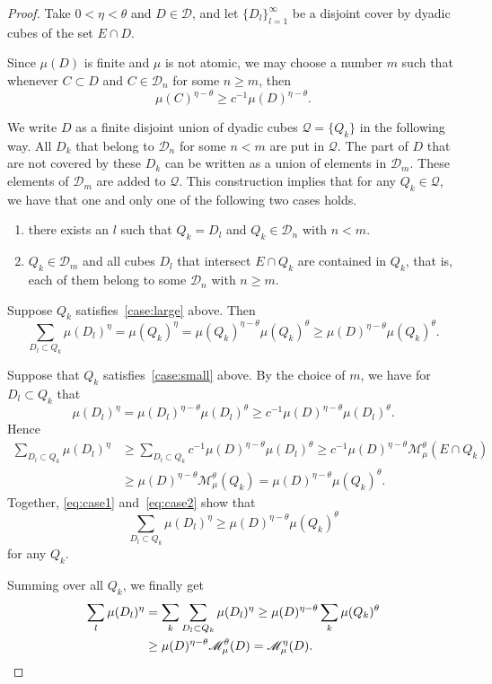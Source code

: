 \documentclass[AHL,Unicode,longabstracts]{cedram}
\begin{document}
\begin{proof}
Take $0 < \eta < \theta$ and $D \in \mathscr{D}$, and let $\{D_l\}_{l=1}^\infty$ be a disjoint cover by dyadic cubes of the set $E \cap D$.

Since $\mu (D)$ is finite and $\mu$ is not atomic, we may choose a number $m$ such that whenever $C \subset D$ and $C \in
\mathscr{D}_n$ for some $n \geq m$, then
\[
\mu (C)^{\eta-\theta} \geq c^{-1} \mu (D)^{\eta-\theta}.
\]

We write $D$ as a finite disjoint union of dyadic cubes $\mathscr{Q} = \{Q_k\}$ in the following way. All $D_k$ that belong to $\mathscr{D}_n$ for some $n < m$ are put in $\mathscr{Q}$. The part of $D$ that are not covered by these $D_k$ can be written as a union of elements in $\mathscr{D}_m$. These elements of $\mathscr{D}_m$ are added to $\mathscr{Q}$. This construction implies that for any $Q_k \in \mathscr{Q}$, we have that one and only one of the following two cases holds.
\renewcommand{\theenumi}{\roman{enumi}}
\begin{enumerate}
\item \label{case:large}
there exists an $l$ such that $Q_k = D_l$ and $Q_k \in
\mathscr{D}_n$ with $n < m$.
\item \label{case:small}
$Q_k \in \mathscr{D}_m$ and all cubes $D_l$ that intersect $E
\cap Q_k$ are contained in $Q_k$, that is, each of them belong to some $\mathscr{D}_n$ with $n \geq m$.
\end{enumerate}

Suppose $Q_k$ satisfies~\eqref{case:large} above. Then
\begin{equation}\label{eq:case1}
\sum_{D_l \subset Q_k} \mu (D_l)^\eta = \mu (Q_k)^\eta = \mu (Q_k)^{\eta-\theta} \mu (Q_k)^\theta \geq \mu (D)^{\eta-\theta}
\mu (Q_k)^\theta.
\end{equation}

Suppose that $Q_k$ satisfies~\eqref{case:small} above. By the choice of $m$, we have for $D_l \subset Q_k$ that
\[
\mu (D_l)^\eta = \mu (D_l)^{\eta-\theta} \mu (D_l)^\theta \geq c^{-1} \mu (D)^{\eta-\theta} \mu (D_l)^\theta.
\]
Hence
\begin{align}
\sum_{D_l \subset Q_k} \mu (D_l)^\eta &\geq \sum_{D_l \subset Q_k} c^{-1} \mu (D)^{\eta-\theta} \mu (D_l)^\theta \geq c^{-1} \mu (D)^{\eta-\theta} \mathscr{M}_\mu^\theta (E \cap Q_k) \nonumber
\\ &\geq \mu (D)^{\eta-\theta} \mathscr{M}_\mu^\theta (Q_k) = \mu (D)^{\eta-\theta} \mu (Q_k)^\theta. \label{eq:case2}
\end{align}
Together, \eqref{eq:case1} and~\eqref{eq:case2} show that
\[
\sum_{D_l \subset Q_k} \mu (D_l)^\eta \geq \mu (D)^{\eta-\theta} \mu (Q_k)^\theta
\]
for any $Q_k$.

Summing over all $Q_k$, we finally get
\begin{align*}
\sum_l \mu (D_l)^\eta &= \sum_k \sum_{D_l \subset Q_k} \mu (D_l)^\eta \geq \mu (D)^{\eta-\theta} \sum_k \mu (Q_k)^\theta
\\ &\geq \mu (D)^{\eta-\theta} \mathscr{M}_\mu^\theta (D) =
\mathscr{M}_\mu^\eta (D). \qedhere
\end{align*}
\end{proof}
\end{document}
